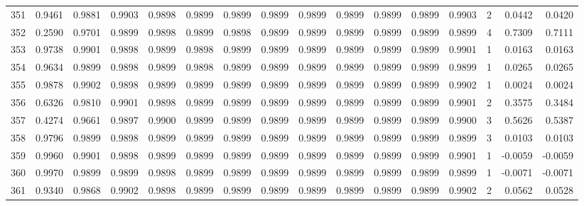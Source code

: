 \begin{tabular}{lrrrrrrrrrrrrrrr}
351 &      0.9461 &  0.9881 &  0.9903 &  0.9898 &  0.9899 &  0.9899 &  0.9899 &  0.9899 &  0.9899 &  0.9899 &   0.9899 &     0.9903 &      2 &                    0.0442 &                     0.0420 \\
352 &      0.2590 &  0.9701 &  0.9899 &  0.9898 &  0.9899 &  0.9898 &  0.9899 &  0.9899 &  0.9899 &  0.9899 &   0.9899 &     0.9899 &      4 &                    0.7309 &                     0.7111 \\
353 &      0.9738 &  0.9901 &  0.9898 &  0.9899 &  0.9898 &  0.9899 &  0.9899 &  0.9899 &  0.9899 &  0.9899 &   0.9899 &     0.9901 &      1 &                    0.0163 &                     0.0163 \\
354 &      0.9634 &  0.9899 &  0.9898 &  0.9899 &  0.9898 &  0.9899 &  0.9899 &  0.9899 &  0.9899 &  0.9899 &   0.9899 &     0.9899 &      1 &                    0.0265 &                     0.0265 \\
355 &      0.9878 &  0.9902 &  0.9898 &  0.9899 &  0.9899 &  0.9899 &  0.9899 &  0.9899 &  0.9899 &  0.9899 &   0.9899 &     0.9902 &      1 &                    0.0024 &                     0.0024 \\
356 &      0.6326 &  0.9810 &  0.9901 &  0.9898 &  0.9899 &  0.9899 &  0.9899 &  0.9899 &  0.9899 &  0.9899 &   0.9899 &     0.9901 &      2 &                    0.3575 &                     0.3484 \\
357 &      0.4274 &  0.9661 &  0.9897 &  0.9900 &  0.9899 &  0.9899 &  0.9899 &  0.9899 &  0.9899 &  0.9899 &   0.9899 &     0.9900 &      3 &                    0.5626 &                     0.5387 \\
358 &      0.9796 &  0.9899 &  0.9898 &  0.9899 &  0.9899 &  0.9899 &  0.9899 &  0.9899 &  0.9899 &  0.9899 &   0.9899 &     0.9899 &      3 &                    0.0103 &                     0.0103 \\
359 &      0.9960 &  0.9901 &  0.9898 &  0.9899 &  0.9899 &  0.9899 &  0.9899 &  0.9899 &  0.9899 &  0.9899 &   0.9899 &     0.9901 &      1 &                   -0.0059 &                    -0.0059 \\
360 &      0.9970 &  0.9899 &  0.9899 &  0.9898 &  0.9899 &  0.9899 &  0.9899 &  0.9899 &  0.9899 &  0.9899 &   0.9899 &     0.9899 &      1 &                   -0.0071 &                    -0.0071 \\
361 &      0.9340 &  0.9868 &  0.9902 &  0.9898 &  0.9899 &  0.9899 &  0.9899 &  0.9899 &  0.9899 &  0.9899 &   0.9899 &     0.9902 &      2 &                    0.0562 &                     0.0528 \\

\end{tabular}
